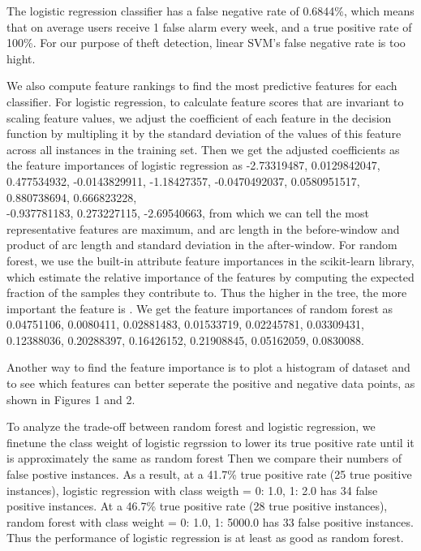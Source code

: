 \documentclass{soups}
\begin{document}
The logistic regression classifier has a false negative rate of 0.6844\%, which means that on average users receive 1 false alarm every week, and a true positive rate of 100\%. For our purpose of theft detection, linear SVM's false negative rate is too hight.

We also compute feature rankings to find the most predictive features for each classifier. For logistic regression, to calculate feature scores that are invariant to scaling feature values, we adjust the coefficient of each feature in the decision function by multipling it by the standard deviation of the values of this feature across all instances in the training set. Then we get the adjusted coefficients as the feature importances of logistic regression as -2.73319487, 0.0129842047, 0.477534932, -0.0143829911, -1.18427357, -0.0470492037, 0.0580951517, 0.880738694, 0.666823228, \\ -0.937781183, 0.273227115, -2.69540663, from which we can tell the most representative features are maximum, and arc length in the before-window and product of arc length and standard deviation in the after-window. For random forest, we use the built-in attribute feature importances in the scikit-learn library, which estimate the relative importance of the features by computing the expected fraction of the samples they contribute to. Thus the higher in the tree, the more important the feature is \cite{sklearn:rfdoc}. We get the feature importances of random forest as 0.04751106, 0.0080411, 0.02881483, 0.01533719, 0.02245781, 0.03309431, 0.12388036, 0.20288397, 0.16426152, 0.21908845, 0.05162059, 0.0830088.

Another way to find the feature importance is to plot a histogram of dataset and to see which features can better seperate the positive and negative data points, as shown in Figures 1 and 2.

To analyze the trade-off between random forest and logistic regression, we finetune the class weight of logistic regrssion to lower its true positive rate until it is approximately the same as random forest Then we compare their numbers of false postive instances. As a result, at a 41.7\% true positive rate (25 true positive instances), logistic regression with class weigth = {0: 1.0, 1: 2.0} has 34 false positive instances. At a 46.7\% true positive rate (28 true positive instances), random forest with class weight = {0: 1.0, 1: 5000.0} has 33 false positive instances. Thus the performance of logistic regression is at least as good as random forest.
\end{document}
